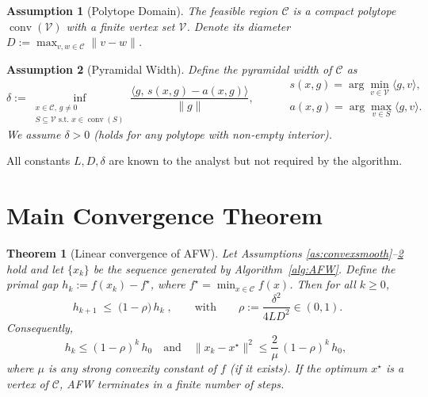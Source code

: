 \documentclass{article}
\newtheorem{theorem}{Theorem}
\newtheorem{assumption}{Assumption}
\begin{document}
\begin{assumption}[Polytope Domain]\label{as:polytope}
The feasible region $\mathcal{C}$ is a compact polytope $\operatorname{conv}(\mathcal{V})$ with a finite vertex set $\mathcal{V}$.
Denote its diameter $D:=\max_{v,w\in\mathcal{C}}\|v-w\|$.
\end{assumption}

\begin{assumption}[Pyramidal Width]\label{as:pyrwidth}
Define the \emph{pyramidal width} of $\mathcal{C}$ as
\[
\delta:=\inf_{\substack{x\in\mathcal{C},\, g\neq 0\\ S\subseteq\mathcal{V}\text{ s.t. }x\in\operatorname{conv}(S)}}
\frac{\langle g,\, s(x,g)-a(x,g)\rangle}{\|g\|},
\qquad
\begin{aligned}
&s(x,g)=\arg\min_{v\in\mathcal{V}}\langle g,v\rangle,\\
&a(x,g)=\arg\max_{v\in S}\langle g,v\rangle .
\end{aligned}
\]
We assume $\delta>0$ (holds for any polytope with non‑empty interior).
\end{assumption}

All constants $L,D,\delta$ are known to the analyst but not required by the algorithm.

\section*{Main Convergence Theorem}
\begin{theorem}[Linear convergence of AFW]\label{thm:linear}
Let Assumptions \ref{as:convexsmooth}–\ref{as:pyrwidth} hold and let $\{x_{k}\}$ be the sequence generated by Algorithm~\ref{alg:AFW}.  
Define the primal gap $h_{k}:=f(x_{k})-f^{\star}$, where $f^{\star}= \min_{x\in\mathcal{C}}f(x)$.  
Then for all $k\ge 0$,
\[
\boxed{ \;h_{k+1}\;\le\;\bigl(1-\rho\bigr)\,h_{k}\;},
\qquad\text{with}\qquad
\rho:=\frac{\delta^{2}}{4L D^{2}}\in(0,1).
\]
Consequently,
\[
h_{k}\le (1-\rho)^{k}\,h_{0}\quad\text{and}\quad
\|x_{k}-x^{\star}\|^{2}\le \frac{2}{\mu}\,(1-\rho)^{k}\,h_{0},
\]
where $\mu$ is any strong convexity constant of $f$ (if it exists).  
If the optimum $x^{\star}$ is a vertex of $\mathcal{C}$, AFW terminates in a finite number of steps.
\end{theorem}
\end{document}
